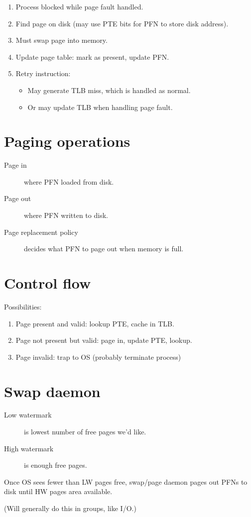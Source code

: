 \begin{enumerate}
\item Process blocked while page fault handled.
\item Find page on disk (may use PTE bits for PFN to store disk address).
\item Must swap page into memory.
\item Update page table: mark as present, update PFN.
\item Retry instruction:
  \begin{itemize}
  \item May generate TLB miss, which is handled as normal.
  \item Or may update TLB when handling page fault.
  \end{itemize}
\end{enumerate}

\section{Paging operations}

\begin{description}
\item[Page in] where PFN loaded from disk.
\item[Page out] where PFN written to disk.
\item[Page replacement policy] decides what PFN to page out when memory is full.
\end{description}

\section{Control flow}

Possibilities:

\begin{enumerate}
\item Page present and valid: lookup PTE, cache in TLB.
\item Page not present but valid: page in, update PTE, lookup.
\item Page invalid: trap to OS (probably terminate process)
\end{enumerate}

\section{Swap daemon}

\begin{description}
\item[Low watermark] is lowest number of free pages we'd like.
\item[High watermark] is enough free pages.
\end{description}

Once OS sees fewer than LW pages free, swap/page daemon pages out PFNs to disk until HW pages area available.

(Will generally do this in groups, like I/O.)




